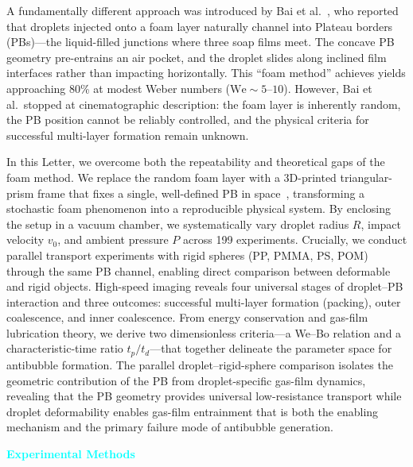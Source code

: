 \documentclass[%
 preprint,
 superscriptaddress,
 amsmath,amssymb,
 aps, prl,
]{revtex4-2}
\begin{document}
A fundamentally different approach was introduced by Bai et al.~\cite{bai_formation_2016}, who reported that droplets injected onto a foam layer naturally channel into Plateau borders (PBs)---the liquid-filled junctions where three soap films meet. The concave PB geometry pre-entrains an air pocket, and the droplet slides along inclined film interfaces rather than impacting horizontally. This ``foam method'' achieves yields approaching 80\% at modest Weber numbers ($\text{We} \sim 5$--$10$). However, Bai et al.\ stopped at cinematographic description: the foam layer is inherently random, the PB position cannot be reliably controlled, and the physical criteria for successful multi-layer formation remain unknown.\par

In this Letter, we overcome both the repeatability and theoretical gaps of the foam method. We replace the random foam layer with a 3D-printed triangular-prism frame that fixes a single, well-defined PB in space~\cite{cohen_inertial_2014,commereuc_straight_nodate}, transforming a stochastic foam phenomenon into a reproducible physical system. By enclosing the setup in a vacuum chamber, we systematically vary droplet radius $R$, impact velocity $v_0$, and ambient pressure $P$ across 199 experiments. Crucially, we conduct parallel transport experiments with rigid spheres (PP, PMMA, PS, POM) through the same PB channel, enabling direct comparison between deformable and rigid objects. High-speed imaging reveals four universal stages of droplet--PB interaction and three outcomes: successful multi-layer formation (packing), outer coalescence, and inner coalescence. From energy conservation and gas-film lubrication theory, we derive two dimensionless criteria---a We--Bo relation and a characteristic-time ratio $t_p/t_d$---that together delineate the parameter space for antibubble formation. The parallel droplet--rigid-sphere comparison isolates the geometric contribution of the PB from droplet-specific gas-film dynamics, revealing that the PB geometry provides universal low-resistance transport while droplet deformability enables gas-film entrainment that is both the enabling mechanism and the primary failure mode of antibubble generation.\par

\textcolor{cyan}{\textbf{Experimental Methods}}\par
\end{document}
